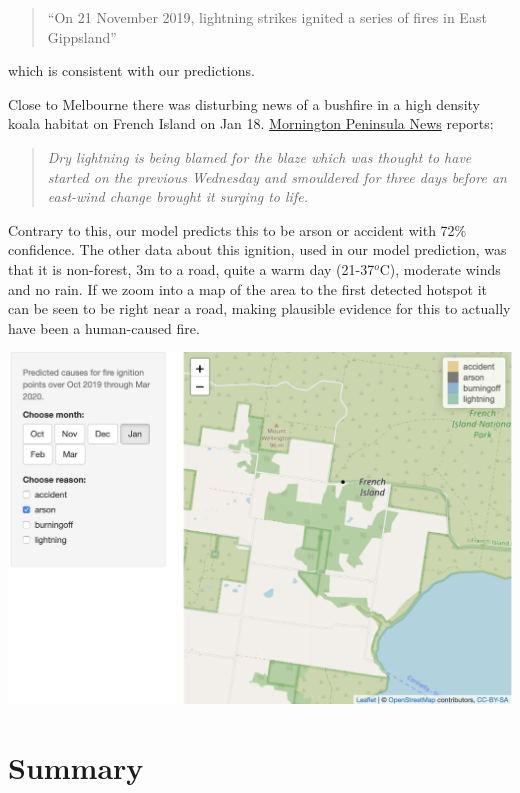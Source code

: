 \documentclass[
  11pt,
  a4paper,
]{article}
\begin{document}
\begin{quote}
``On 21 November 2019, lightning strikes ignited a series of fires in East Gippsland''
\end{quote}

which is consistent with our predictions.

Close to Melbourne there was disturbing news of a bushfire in a high density koala habitat on French Island on Jan 18. \href{http://www.mpnews.com.au/2020/01/21/all-clear-after-island-fire-fright/}{Mornington Peninsula News} reports:

\begin{quote}
\emph{Dry lightning is being blamed for the blaze which was thought to have started on the previous Wednesday and smouldered for three days before an east-wind change brought it surging to life.}
\end{quote}

Contrary to this, our model predicts this to be arson or accident with 72\% confidence. The other data about this ignition, used in our model prediction, was that it is non-forest, 3m to a road, quite a warm day (21-37\(^o\)C), moderate winds and no rain. If we zoom into a map of the area to the first detected hotspot it can be seen to be right near a road, making plausible evidence for this to actually have been a human-caused fire.

\includegraphics{french_island.png}

\hypertarget{summary}{%
\section{Summary}\label{summary}}
\end{document}
